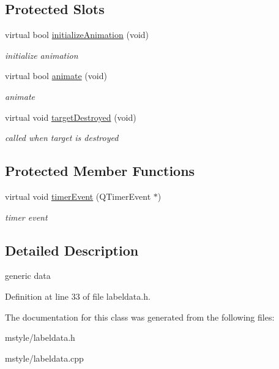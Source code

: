 \subsection*{Protected Slots}
\begin{DoxyCompactItemize}
\item 
\mbox{\label{class_label_data_af803f10ebc9085f5e8f21245b9c91492}} 
virtual bool \hyperlink{class_label_data_af803f10ebc9085f5e8f21245b9c91492}{initialize\+Animation} (void)
\begin{DoxyCompactList}\small\item\em initialize animation \end{DoxyCompactList}\item 
\mbox{\label{class_label_data_a864f2f37aca434d9ca969071e8045ccd}} 
virtual bool \hyperlink{class_label_data_a864f2f37aca434d9ca969071e8045ccd}{animate} (void)
\begin{DoxyCompactList}\small\item\em animate \end{DoxyCompactList}\item 
\mbox{\label{class_label_data_a439850c21399df83afcba8aeb8d948cb}} 
virtual void \hyperlink{class_label_data_a439850c21399df83afcba8aeb8d948cb}{target\+Destroyed} (void)
\begin{DoxyCompactList}\small\item\em called when target is destroyed \end{DoxyCompactList}\end{DoxyCompactItemize}
\subsection*{Protected Member Functions}
\begin{DoxyCompactItemize}
\item 
\mbox{\label{class_label_data_a73ddfd31a9db6c9a161e14c17f6cbf13}} 
virtual void \hyperlink{class_label_data_a73ddfd31a9db6c9a161e14c17f6cbf13}{timer\+Event} (Q\+Timer\+Event $\ast$)
\begin{DoxyCompactList}\small\item\em timer event \end{DoxyCompactList}\end{DoxyCompactItemize}


\subsection{Detailed Description}
generic data 

Definition at line 33 of file labeldata.\+h.



The documentation for this class was generated from the following files\+:\begin{DoxyCompactItemize}
\item 
mstyle/labeldata.\+h\item 
mstyle/labeldata.\+cpp\end{DoxyCompactItemize}
